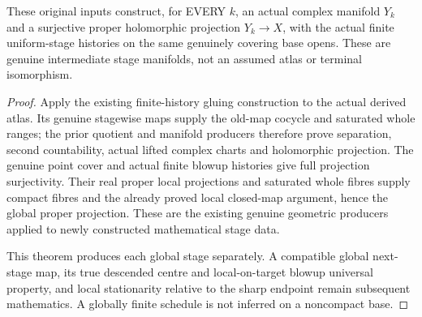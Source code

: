 \begin{theorem}
\label{hir:sharp-actual-curve-original-global-uniform-stages}
\leanok
These original inputs construct, for EVERY $k$, an actual complex
manifold $Y_k$ and a surjective proper holomorphic projection
$Y_k\to X$, with the actual finite uniform-stage histories on the
same genuinely covering base opens. These are genuine intermediate
stage manifolds, not an assumed atlas or terminal isomorphism.
\end{theorem}
\begin{proof}
Apply the existing finite-history gluing construction to the actual
derived atlas. Its genuine stagewise maps supply the old-map cocycle
and saturated whole ranges; the prior quotient and manifold producers
therefore prove separation, second countability, actual lifted complex
charts and holomorphic projection. The genuine point cover and actual
finite blowup histories give full projection surjectivity. Their real
proper local projections and saturated whole fibres supply compact
fibres and the already proved local closed-map argument, hence the
global proper projection. These are the existing genuine geometric
producers applied to newly constructed mathematical stage data.

This theorem produces each global stage separately. A compatible
global next-stage map, its true descended centre and local-on-target
blowup universal property, and local stationarity relative to the
sharp endpoint remain subsequent mathematics. A globally finite
schedule is not inferred on a noncompact base.
\end{proof}
